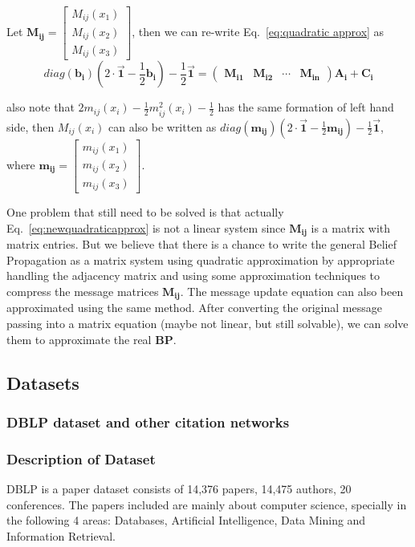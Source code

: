 Let $\mathbf{M_{ij}} = \left[ \begin{array}{c}
M_{ij}(x_1) \\
M_{ij}(x_2) \\
M_{ij}(x_3) \end{array} \right]$, then we can re-write Eq.~\ref{eq:quadratic approx} as
\begin{equation}
\label{eq:newquadraticapprox}
diag(\mathbf{b_i})
(2\cdot\mathbf{\vec{1}}
-\frac{1}{2}\mathbf{b_i})-
\frac{1}{2}\mathbf{\vec{1}}
= \left( \begin{array}{cccc}
\mathbf{M_{i1}}&\mathbf{M_{i2}}&\cdots& \mathbf{M_{in}}\end{array} \right)\mathbf{A_i}+\mathbf{C_i}
\end{equation}

also note that $2m_{ij}(x_i)-\frac{1}{2}m_{ij}^2(x_i)-\frac{1}{2}$ has the same formation of left hand side, then $M_{ij}(x_i)$ can also be written as
$diag(\mathbf{m_{ij}})(2\cdot\mathbf{\vec{1}}-\frac{1}{2}\mathbf{m_{ij}})-\frac{1}{2}\mathbf{\vec{1}}$, where $\mathbf{m_{ij}}=\left[ \begin{array}{c}
m_{ij}(x_1) \\
m_{ij}(x_2) \\
m_{ij}(x_3) \end{array} \right]$.

One problem that still need to be solved is that actually Eq.~\ref{eq:newquadraticapprox} is not a linear system since $\mathbf{M_{ij}}$ is a matrix with matrix entries. But we believe that there is a chance to write the general Belief Propagation as a matrix system using quadratic approximation by appropriate handling the adjacency matrix and using some approximation techniques to compress the message matrices $\mathbf{M_{ij}}$. The message update equation can also been approximated using the same method. After converting the original message passing into a matrix equation (maybe not linear, but still solvable), we can solve them to approximate the real \textbf{BP}.


\subsection{Datasets}
\subsubsection{DBLP dataset and other citation networks}
\subsubsection*{Description of Dataset}
DBLP is a paper dataset consists of 14,376 papers, 14,475 authors, 20 conferences. The papers included are mainly about computer science, specially in the following 4 areas: Databases, Artificial Intelligence, Data Mining and Information Retrieval. 
